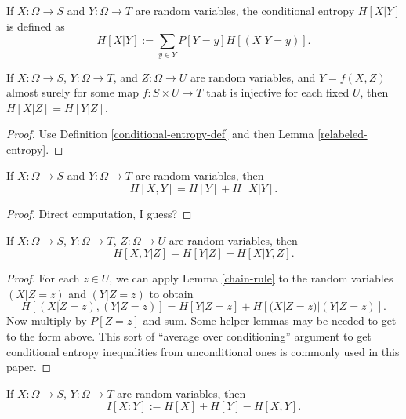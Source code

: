 \begin{definition}\label{conditional-entropy-def}
    If $X: \Omega \to S$ and $Y: \Omega \to T$ are random variables, the conditional entropy $H[X|Y]$ is defined as
  $$ H[X|Y] := \sum_{y \in Y} P[Y = y] H[(X | Y=y)].$$
\end{definition}

\begin{lemma}\label{relabeled-entropy-cond}   If $X: \Omega \to S$, $Y: \Omega \to T$, and $Z: \Omega \to U$ are random variables, and $Y = f(X,Z)$ almost surely for some map $f: S \times U \to T$ that is injective for each fixed $U$, then $H[X|Z] = H[Y|Z]$.
\end{lemma}

\begin{proof}   Use Definition \ref{conditional-entropy-def} and then Lemma \ref{relabeled-entropy}.
\end{proof}


\begin{lemma}\label{chain-rule}
  If $X: \Omega \to S$ and $Y: \Omega \to T$ are random variables, then
  $$ H[ X,Y  ] = H[Y] + H[X|Y].$$
\end{lemma}

\begin{proof} Direct computation, I guess?
\end{proof}

\begin{lemma}\label{conditional-chain-rule} 
  If $X: \Omega \to S$, $Y: \Omega \to T$, $Z: \Omega \to U$ are random variables, then
$$ H[  X,Y | Z ] = H[Y | Z] + H[X|Y, Z].$$
\end{lemma}

\begin{proof}   For each $z \in U$, we can apply Lemma \ref{chain-rule} to the random variables $(X|Z=z)$ and $(Y|Z=z)$ to obtain
$$ H[ (X|Z=z),(Y|Z=z) ] = H[Y|Z=z] + H[(X|Z=z)|(Y|Z=z)].$$
Now multiply by $P[Z=z]$ and sum.  Some helper lemmas may be needed to get to the form above.  This sort of ``average over conditioning'' argument to get conditional entropy inequalities from unconditional ones is commonly used in this paper.
\end{proof}

\begin{definition}\label{information-def} If $X: \Omega \to S$, $Y: \Omega \to T$ are random variables, then
  $$ I[ X : Y ] := H[X] + H[Y] - H[X,Y].$$
\end{definition}

